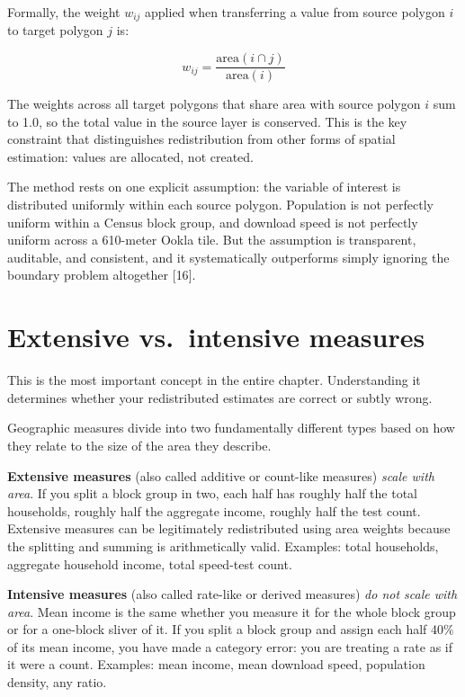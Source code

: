 \documentclass[
  letterpaper,
  DIV=11,
  numbers=noendperiod]{scrreprt}
\begin{document}
Formally, the weight \(w_{ij}\) applied when transferring a value from
source polygon \(i\) to target polygon \(j\) is:

\[w_{ij} = \frac{\text{area}(i \cap j)}{\text{area}(i)}\]

The weights across all target polygons that share area with source
polygon \(i\) sum to 1.0, so the total value in the source layer is
conserved. This is the key constraint that distinguishes redistribution
from other forms of spatial estimation: values are allocated, not
created.

The method rests on one explicit assumption: the variable of interest is
distributed uniformly within each source polygon. Population is not
perfectly uniform within a Census block group, and download speed is not
perfectly uniform across a 610-meter Ookla tile. But the assumption is
transparent, auditable, and consistent, and it systematically
outperforms simply ignoring the boundary problem altogether {[}16{]}.

\section{Extensive vs.~intensive
measures}\label{sec-extensive-intensive}

This is the most important concept in the entire chapter. Understanding
it determines whether your redistributed estimates are correct or subtly
wrong.

Geographic measures divide into two fundamentally different types based
on how they relate to the size of the area they describe.

\textbf{Extensive measures} (also called additive or count-like
measures) \emph{scale with area}. If you split a block group in two,
each half has roughly half the total households, roughly half the
aggregate income, roughly half the test count. Extensive measures can be
legitimately redistributed using area weights because the splitting and
summing is arithmetically valid. Examples: total households, aggregate
household income, total speed-test count.

\textbf{Intensive measures} (also called rate-like or derived measures)
\emph{do not scale with area}. Mean income is the same whether you
measure it for the whole block group or for a one-block sliver of it. If
you split a block group and assign each half 40\% of its mean income,
you have made a category error: you are treating a rate as if it were a
count. Examples: mean income, mean download speed, population density,
any ratio.
\end{document}

